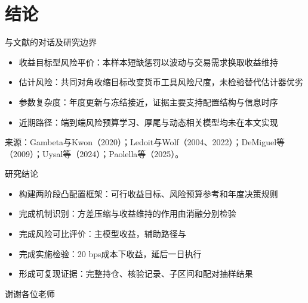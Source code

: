 \documentclass[aspectratio=169,11pt]{beamer}
\begin{document}
\section{结论}
\begin{frame}{与文献的对话及研究边界}
\small
\begin{itemize}
\item 收益目标型风险平价：本样本短缺惩罚以波动与交易需求换取收益维持
\item 估计风险：共同对角收缩目标改变货币工具风险尺度，未检验替代估计器优劣
\item 参数复杂度：年度更新与冻结接近，证据主要支持配置结构与信息时序
\item 近期路径：端到端风险预算学习、厚尾与动态相关模型均未在本文实现
\end{itemize}
\medskip\scriptsize 来源：Gambeta与Kwon（2020）；Ledoit与Wolf（2004、2022）；DeMiguel等（2009）；Uysal等（2024）；Paolella等（2025）。
\end{frame}
\begin{frame}{研究结论}
\begin{itemize}
\item 构建两阶段凸配置框架：可行收益目标、风险预算参考和年度决策规则
\item 完成机制识别：方差压缩与收益维持的作用由消融分别检验
\item 完成风险可比评价：主模型收益\globalNetReturn，辅助路径\diagMatchedEWReturn{}与\diagMatchedSBReturn
\item 完成实施检验：20 bps成本下收益\diagCostTwentyReturn，延后一日执行\diagDelayReturn
\item 形成可复现证据：完整持仓、核验记录、子区间和配对抽样结果
\end{itemize}
\end{frame}
\begin{frame}[plain]\centering\Huge 谢谢各位老师\end{frame}
\end{document}
